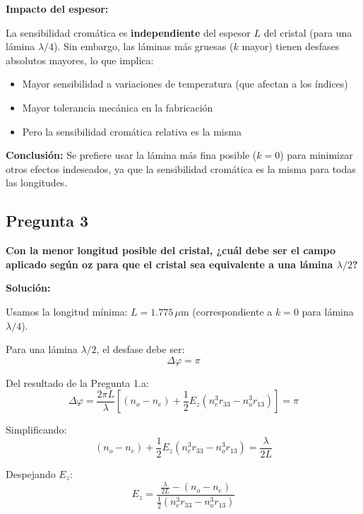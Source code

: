 \documentclass[12pt,a4paper]{article}
\begin{document}
\textbf{Impacto del espesor:}

La sensibilidad cromática es \textbf{independiente} del espesor $L$ del cristal (para una lámina $\lambda/4$). Sin embargo, las láminas más gruesas ($k$ mayor) tienen desfases absolutos mayores, lo que implica:

\begin{itemize}
    \item Mayor sensibilidad a variaciones de temperatura (que afectan a los índices)
    \item Mayor tolerancia mecánica en la fabricación
    \item Pero la sensibilidad cromática relativa es la misma
\end{itemize}

\textbf{Conclusión:} Se prefiere usar la lámina más fina posible ($k=0$) para minimizar otros efectos indeseados, ya que la sensibilidad cromática es la misma para todas las longitudes.

\subsection*{Pregunta 3}
\textbf{Con la menor longitud posible del cristal, ¿cuál debe ser el campo aplicado según oz para que el cristal sea equivalente a una lámina $\lambda/2$?}

\vspace{0.3cm}
\textbf{Solución:}

Usamos la longitud mínima: $L = 1.775 \, \mu\text{m}$ (correspondiente a $k=0$ para lámina $\lambda/4$).

Para una lámina $\lambda/2$, el desfase debe ser:
\begin{equation}
\Delta\varphi = \pi
\end{equation}

Del resultado de la Pregunta 1.a:
\begin{equation}
\Delta\varphi = \frac{2\pi L}{\lambda} \left[ (n_o - n_e) + \frac{1}{2}E_z(n_e^3 r_{33} - n_o^3 r_{13}) \right] = \pi
\end{equation}

Simplificando:
\begin{equation}
(n_o - n_e) + \frac{1}{2}E_z(n_e^3 r_{33} - n_o^3 r_{13}) = \frac{\lambda}{2L}
\end{equation}

Despejando $E_z$:
\begin{equation}
E_z = \frac{\frac{\lambda}{2L} - (n_o - n_e)}{\frac{1}{2}(n_e^3 r_{33} - n_o^3 r_{13})}
\end{equation}
\end{document}
